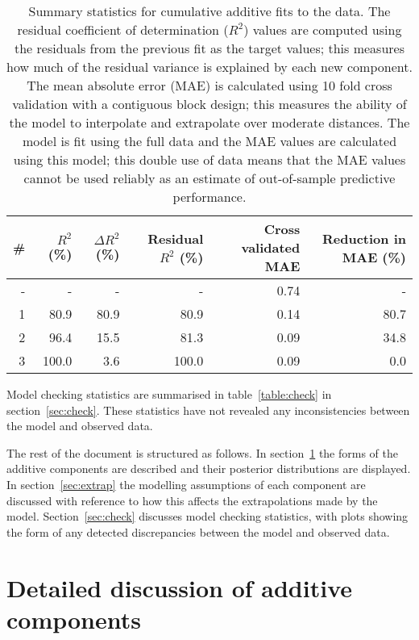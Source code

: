 \documentclass{article} %
\begin{document}
\begin{table}[htb]
\begin{center}
{\small
\begin{tabular}{|r|rrrrr|}
\hline
\bf{\#} & {$R^2$ (\%)} & {$\Delta R^2$ (\%)} & {Residual $R^2$ (\%)} & {Cross validated MAE} & Reduction in MAE (\%)\\
\hline
- & - & - & - & 0.74 & -\\

1 & 80.9 & 80.9 & 80.9 & 0.14 & 80.7\\

2 & 96.4 & 15.5 & 81.3 & 0.09 & 34.8\\

3 & 100.0 & 3.6 & 100.0 & 0.09 & 0.0\\

\hline
\end{tabular}
\caption{
Summary statistics for cumulative additive fits to the data.
The residual coefficient of determination ($R^2$) values are computed using the residuals from the previous fit as the target values; this measures how much of the residual variance is explained by each new component.
The mean absolute error (MAE) is calculated using 10 fold cross validation with a contiguous block design; this measures the ability of the model to interpolate and extrapolate over moderate distances.
The model is fit using the full data and the MAE values are calculated using this model; this double use of data means that the MAE values cannot be used reliably as an estimate of out-of-sample predictive performance.
}
\label{table:stats}
}
\end{center}
\end{table}

Model checking statistics are summarised in table~\ref{table:check} in section~\ref{sec:check}.
These statistics have not revealed any inconsistencies between the model and observed data.

The rest of the document is structured as follows.
In section~\ref{sec:discussion} the forms of the additive components are described and their posterior distributions are displayed.
In section~\ref{sec:extrap} the modelling assumptions of each component are discussed with reference to how this affects the extrapolations made by the model.
Section~\ref{sec:check} discusses model checking statistics, with plots showing the form of any detected discrepancies between the model and observed data.

\section{Detailed discussion of additive components}
\label{sec:discussion}
\end{document}
